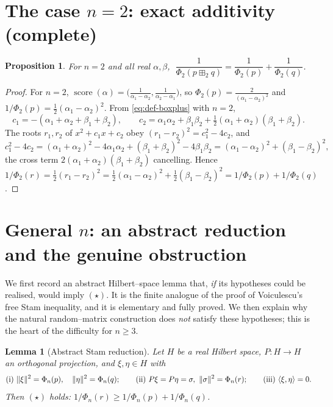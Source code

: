 \documentclass[12pt]{article}
\newtheorem{lemma}{Lemma}
\newtheorem{proposition}{Proposition}
\theoremstyle{definition}
\DeclareMathOperator{\score}{score}
\begin{document}
\section{The case $n=2$: exact additivity (complete)}\label{sec:n2}

\begin{proposition}\label{prop:n2}
For $n=2$ and all real $\alpha,\beta$,
$\;\dfrac1{\Phi_2(p\boxplus_2 q)}=\dfrac1{\Phi_2(p)}+\dfrac1{\Phi_2(q)}$.
\end{proposition}

\begin{proof}
For $n=2$, $\score(\alpha)=\bigl(\tfrac1{\alpha_1-\alpha_2},\tfrac1{\alpha_2-\alpha_1}\bigr)$,
so $\Phi_2(p)=\frac{2}{(\alpha_1-\alpha_2)^2}$ and
$1/\Phi_2(p)=\tfrac12(\alpha_1-\alpha_2)^2$. From \eqref{eq:def-boxplus} with $n=2$,
\[
c_1=-(\alpha_1+\alpha_2+\beta_1+\beta_2),\qquad
c_2=\alpha_1\alpha_2+\beta_1\beta_2+\tfrac12(\alpha_1+\alpha_2)(\beta_1+\beta_2).
\]
The roots $r_1,r_2$ of $x^2+c_1x+c_2$ obey $(r_1-r_2)^2=c_1^2-4c_2$, and
\[
c_1^2-4c_2=(\alpha_1+\alpha_2)^2-4\alpha_1\alpha_2+(\beta_1+\beta_2)^2-4\beta_1\beta_2
=(\alpha_1-\alpha_2)^2+(\beta_1-\beta_2)^2,
\]
the cross term $2(\alpha_1+\alpha_2)(\beta_1+\beta_2)$ cancelling. Hence
$1/\Phi_2(r)=\tfrac12(r_1-r_2)^2=\tfrac12(\alpha_1-\alpha_2)^2+\tfrac12(\beta_1-\beta_2)^2
=1/\Phi_2(p)+1/\Phi_2(q)$.
\end{proof}

\section{General $n$: an abstract reduction and the genuine obstruction}
\label{sec:general}

We first record an abstract Hilbert--space lemma that, \emph{if} its hypotheses could be
realised, would imply $(\star)$. It is the finite analogue of the proof of Voiculescu's free
Stam inequality, and it is elementary and fully proved. We then explain why the natural
random--matrix construction does \emph{not} satisfy these hypotheses; this is the heart of the
difficulty for $n\ge3$.

\begin{lemma}[Abstract Stam reduction]\label{lem:reduction}
Let $H$ be a real Hilbert space, $P\colon H\to H$ an orthogonal projection, and
$\xi,\eta\in H$ with
\[
\textup{(i)}\ \|\xi\|^2=\Phi_n(p),\quad \|\eta\|^2=\Phi_n(q);\qquad
\textup{(ii)}\ P\xi=P\eta=\sigma,\ \|\sigma\|^2=\Phi_n(r);\qquad
\textup{(iii)}\ \langle\xi,\eta\rangle=0.
\]
Then $(\star)$ holds: $1/\Phi_n(r)\ge 1/\Phi_n(p)+1/\Phi_n(q)$.
\end{lemma}
\end{document}
